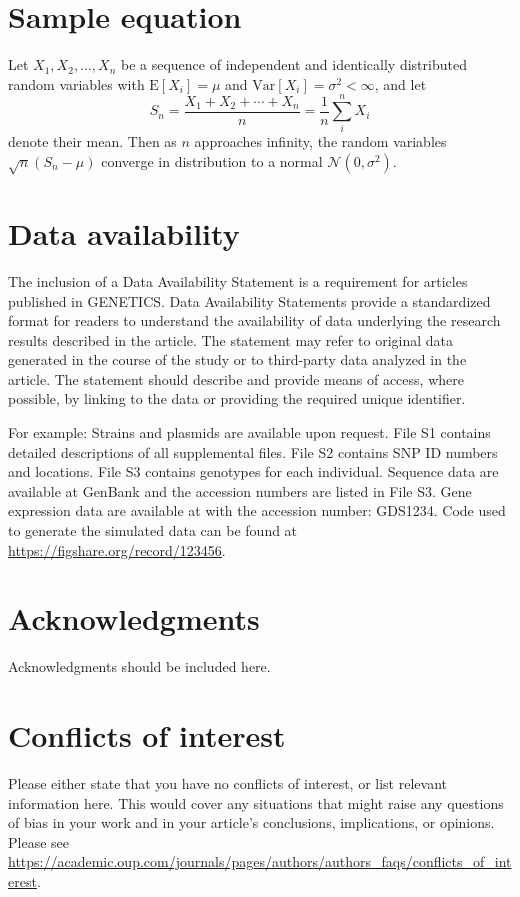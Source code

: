 {\begin{multicols}{2}
    \section{Sample equation}
    Let $X_1, X_2, \ldots, X_n$ be a sequence of independent and identically distributed random variables with $\text{E}[X_i] = \mu$ and $\text{Var}[X_i] = \sigma^2 < \infty$, and let
    \begin{equation}
    S_n = \frac{X_1 + X_2 + \cdots + X_n}{n}
          = \frac{1}{n}\sum_{i}^{n} X_i
    \label{eq:refname1}
    \end{equation}
    denote their mean. Then as $n$ approaches infinity, the random variables $\sqrt{n}(S_n - \mu)$ converge in distribution to a normal $\mathcal{N}(0, \sigma^2)$.
    
    \section{Data availability}
    The inclusion of a Data Availability Statement is a requirement for articles published in GENETICS. Data Availability Statements provide a standardized format for readers to understand the availability of data underlying the research results described in the article. The statement may refer to original data generated in the course of the study or to third-party data analyzed in the article. The statement should describe and provide means of access, where possible, by linking to the data or providing the required unique identifier.
    
    For example: Strains and plasmids are available upon request. File S1 contains detailed descriptions of all supplemental files. File S2 contains SNP ID numbers and locations. File S3 contains genotypes for each individual. Sequence data are available at GenBank and the accession numbers are listed in File S3. Gene expression data are available at \diteGEO with the accession number: GDS1234. Code used to generate the simulated data can be found at \url{https://figshare.org/record/123456}.
    
    \section{Acknowledgments}
    Acknowledgments should be included here.
    
    \section{Conflicts of interest}
    Please either state that you have no conflicts of interest, or \citep[pp.2-3]{Tewabe2021}list relevant information here.  This would cover any situations that might raise any questions of bias in your work and in your article’s conclusions, implications, or opinions. Please see \url{https://academic.oup.com/journals/pages/authors/authors_faqs/conflicts_of_interest}.
    
    
    
    \end{multicols}
}
\endinput